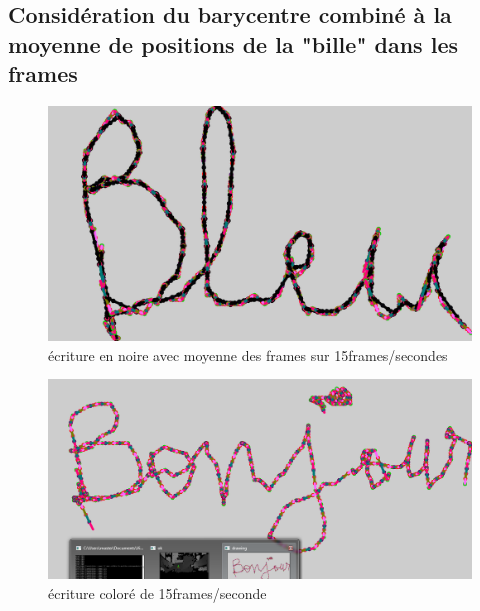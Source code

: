 \documentclass[12pt,a4paper,oneside]{book}
\begin{document}
	\subsection{Considération du barycentre combiné à la moyenne de positions de la "bille" dans les frames}
	
	
	\begin{figure}[H]
		
		\centering
		\includegraphics[scale=0.5]{bleubarycentremoyenne.png}
		\caption{écriture en noire avec moyenne des frames sur 15frames/secondes}
		\label{fig13}
		
	\end{figure}
	
	\begin{figure}[H]
		\centering
		\includegraphics[scale=0.5]{bnjr.png}
		\caption{écriture coloré de 15frames/seconde}
		
	\end{figure}
\end{document}
